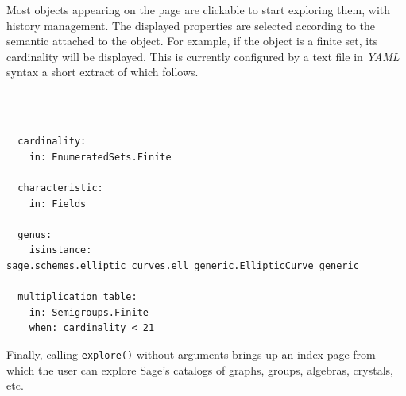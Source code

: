 \documentclass{deliverablereport}
\begin{document}



Most objects appearing on the page are clickable to start exploring
them, with history management. The displayed properties are selected
according to the semantic attached to the object. For example, if the
object is a finite set, its cardinality will be displayed. This is
currently configured by a text file in \emph{YAML} syntax a short
extract of which follows.

\ 
\begin{verbatim}

  cardinality:
    in: EnumeratedSets.Finite

  characteristic:
    in: Fields

  genus:
    isinstance: sage.schemes.elliptic_curves.ell_generic.EllipticCurve_generic

  multiplication_table:
    in: Semigroups.Finite
    when: cardinality < 21
\end{verbatim}

Finally, calling \texttt{explore()} without arguments brings up an
index page from which the user can explore Sage's catalogs of graphs,
groups, algebras, crystals, etc.




\end{document}
